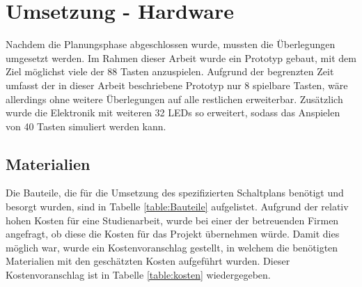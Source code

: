 
\chapter{Umsetzung - Hardware} \label{umsetzungHW}


Nachdem die Planungsphase abgeschlossen wurde, mussten die Überlegungen umgesetzt werden.
Im Rahmen dieser Arbeit wurde ein Prototyp gebaut, mit dem Ziel möglichst viele der 88 Tasten anzuspielen.
Aufgrund der begrenzten Zeit umfasst der in dieser Arbeit beschriebene Prototyp nur 8 spielbare Tasten,
wäre allerdings ohne weitere Überlegungen auf alle restlichen erweiterbar.
Zusätzlich wurde die Elektronik mit weiteren 32 LEDs so erweitert, sodass das Anspielen von 40 Tasten simuliert werden kann.


\section{Materialien}

Die Bauteile, die für die Umsetzung des spezifizierten Schaltplans benötigt und besorgt wurden, sind in Tabelle \ref{table:Bauteile} aufgelistet. \newline
Aufgrund der relativ hohen Kosten für eine Studienarbeit, wurde bei einer der betreuenden Firmen angefragt, ob diese die Kosten für das Projekt übernehmen würde.
Damit dies möglich war, wurde ein Kostenvoranschlag gestellt, in welchem die benötigten Materialien mit den geschätzten Kosten aufgeführt wurden. \newline
Dieser Kostenvoranschlag ist in Tabelle \ref{table:kosten} wiedergegeben.



